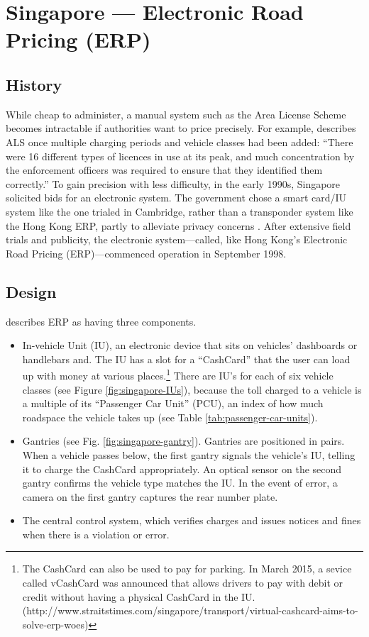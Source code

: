 
\section{Singapore --- Electronic Road Pricing (ERP)}

\subsection{History}

While cheap to administer, a manual system such as the Area License Scheme becomes intractable if authorities want to price precisely. For example, \citet[p. 4]{Chin2010} describes ALS once multiple charging periods and vehicle classes had been added: ``There were 16 different types of licences in use at its peak, and much concentration by the enforcement officers was required to ensure that they identified them correctly.''
To gain precision with less difficulty, in the early 1990s, Singapore solicited bids for an electronic system. The government chose a smart card/IU system like the one trialed in Cambridge, rather than a transponder system like the Hong Kong ERP, partly to alleviate privacy concerns \citep{PhangToh1997,Chin2010}. After extensive field trials and publicity, the electronic system---called, like Hong Kong's Electronic Road Pricing (ERP)---commenced operation in September 1998.

\subsection{Design}

\citet{Menon2004} describes ERP as having three components.

\begin{itemize}
\item In-vehicle Unit (IU), an electronic device that sits on vehicles' dashboards or handlebars and. The IU has a slot for a ``CashCard'' that the user can load up with money at various places.\footnote{The CashCard can also be used to pay for parking. In March 2015, a sevice called vCashCard was announced that allows drivers to pay with debit or credit without having a physical CashCard in the IU. (http://www.straitstimes.com/singapore/transport/virtual-cashcard-aims-to-solve-erp-woes)} There are IU's for each of six vehicle classes (see Figure \ref{fig:singapore-IUs}), because the toll charged to a vehicle is a multiple of its ``Passenger Car Unit'' (PCU), an index of how much roadspace the vehicle takes up (see Table \ref{tab:passenger-car-units}). 

\item Gantries (see Fig. \ref{fig:singapore-gantry}). Gantries are positioned in pairs. When a vehicle passes below, the first gantry signals the vehicle's IU, telling it to charge the CashCard appropriately. An optical sensor on the second gantry confirms the vehicle type matches the IU. In the event of error, a camera on the first gantry captures the rear number plate. 

\item The central control system, which verifies charges and issues notices and fines when there is a violation or error.
\end{itemize}

